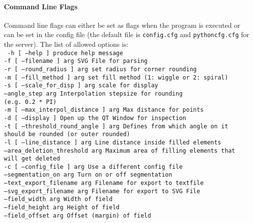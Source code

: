 \paragraph{Command Line Flags}
Command line flags can either be set as flags when the program is executed or can be set in the config file (the default file is \texttt{config.cfg} and \texttt{pythoncfg.cfg} for the server).
The list of allowed options is:
\small \\
\texttt{
  -h [ --help ]                        produce help message\\
  -f [ --filename ] arg                SVG File for parsing\\
  -r [ --round\_radius ] arg            set radius for corner rounding\\
  -m [ --fill\_method ] arg             set fill method (1: wiggle or 2: spiral)\\
  -s [ --scale\_for\_disp ] arg          scale for display\\
  --angle\_step arg                     Interpolation stepsize for rounding \\
                                       (e.g. 0.2 * PI)\\
  -m [ --max\_interpol\_distance ] arg   Max distance for points \\
  -d [ --display ]                     Open up the QT Window for inspection\\
  -t [ --threshold\_round\_angle ] arg   Defines from which angle on it should be rounded (or outer rounded)\\
  -l [ --line\_distance ] arg           Line distance inside filled elements\\
  --area\_deletion\_threshold arg        Maximum area of filling elements that will get deleted \\
  -c [ --config\_file ] arg             Use a different config file\\
  --segmentation\_on arg                Turn on or off segmentation\\
  --text\_export\_filename arg          Filename for export to textfile\\
  --svg\_export\_filename arg            Filename for export to SVG File\\
  --field\_width arg                    Width of field\\
  --field\_height arg                   Height of field\\
  --field\_offset arg                   Offset (margin) of field\\
}
